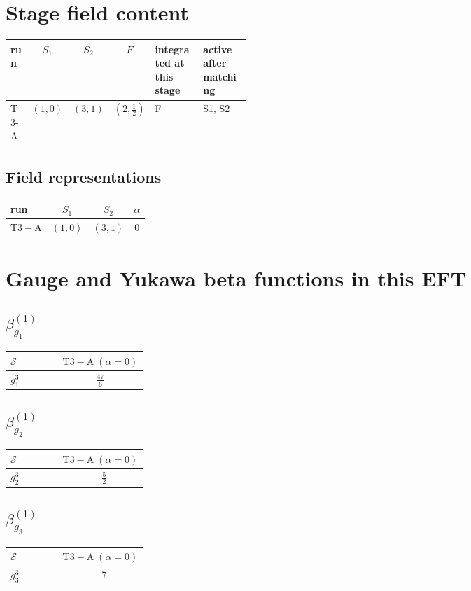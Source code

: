 \documentclass[9pt]{article}
\begin{document}
\section*{Stage field content}
\begin{longtable}{@{}lccc p{0.20\linewidth}p{0.20\linewidth}@{}}
\toprule
run & $S_1$ & $S_2$ & $F$ & integrated at this stage & active after matching \\
\midrule
T3-A & $(1,0)$ & $(3,1)$ & $(2,\frac{1}{2})$ & F & S1, S2 \\
\bottomrule
\end{longtable}
\subsection*{Field representations}
\begin{longtable}{@{}lccc@{}}
\toprule
run & $S_1$ & $S_2$ & $\alpha$ \\
\midrule
$\mathrm{T3-A}$ & $(1,0)$ & $(3,1)$ & $0$ \\
\bottomrule
\end{longtable}
\section*{Gauge and Yukawa beta functions in this EFT}
\subsection*{$ \beta_{g_1}^{(1)} $}
\begin{longtable}{@{}p{0.38\linewidth}c@{}}
\toprule
$\mathcal{S}$ & $ \mathrm{T3-A}\;(\alpha=0) $ \\
\midrule
$ g_1^3 $ & $ \frac{47}{6} $ \\
\bottomrule
\end{longtable}
\subsection*{$ \beta_{g_2}^{(1)} $}
\begin{longtable}{@{}p{0.38\linewidth}c@{}}
\toprule
$\mathcal{S}$ & $ \mathrm{T3-A}\;(\alpha=0) $ \\
\midrule
$ g_2^3 $ & $ - \frac{5}{2} $ \\
\bottomrule
\end{longtable}
\subsection*{$ \beta_{g_3}^{(1)} $}
\begin{longtable}{@{}p{0.38\linewidth}c@{}}
\toprule
$\mathcal{S}$ & $ \mathrm{T3-A}\;(\alpha=0) $ \\
\midrule
$ g_3^3 $ & $ -7 $ \\
\bottomrule
\end{longtable}
\end{document}

